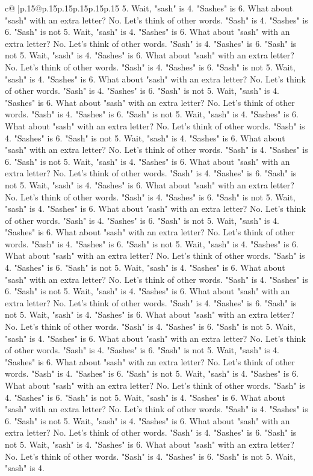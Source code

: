 \documentclass{article}
\begin{document}
{\begin{supertabular}{c@{$\;$}|p{.15\linewidth}@{}p{.15\linewidth}p{.15\linewidth}p{.15\linewidth}p{.15\linewidth}p{.15\linewidth}}
{{{5. Wait, "sash" is 4. "Sashes" is 6. What about "sash" with an extra letter? No. Let's think of other words. "Sash" is 4. "Sashes" is 6. "Sash" is not 5. Wait, "sash" is 4. "Sashes" is 6. What about "sash" with an extra letter? No. Let's think of other words. "Sash" is 4. "Sashes" is 6. "Sash" is not 5. Wait, "sash" is 4. "Sashes" is 6. What about "sash" with an extra letter? No. Let's think of other words. "Sash" is 4. "Sashes" is 6. "Sash" is not 5. Wait, "sash" is 4. "Sashes" is 6. What about "sash" with an extra letter? No. Let's think of other words. "Sash" is 4. "Sashes" is 6. "Sash" is not 5. Wait, "sash" is 4. "Sashes" is 6. What about "sash" with an extra letter? No. Let's think of other words. "Sash" is 4. "Sashes" is 6. "Sash" is not 5. Wait, "sash" is 4. "Sashes" is 6. What about "sash" with an extra letter? No. Let's think of other words. "Sash" is 4. "Sashes" is 6. "Sash" is not 5. Wait, "sash" is 4. "Sashes" is 6. What about "sash" with an extra letter? No. Let's think of other words. "Sash" is 4. "Sashes" is 6. "Sash" is not 5. Wait, "sash" is 4. "Sashes" is 6. What about "sash" with an extra letter? No. Let's think of other words. "Sash" is 4. "Sashes" is 6. "Sash" is not 5. Wait, "sash" is 4. "Sashes" is 6. What about "sash" with an extra letter? No. Let's think of other words. "Sash" is 4. "Sashes" is 6. "Sash" is not 5. Wait, "sash" is 4. "Sashes" is 6. What about "sash" with an extra letter? No. Let's think of other words. "Sash" is 4. "Sashes" is 6. "Sash" is not 5. Wait, "sash" is 4. "Sashes" is 6. What about "sash" with an extra letter? No. Let's think of other words. "Sash" is 4. "Sashes" is 6. "Sash" is not 5. Wait, "sash" is 4. "Sashes" is 6. What about "sash" with an extra letter? No. Let's think of other words. "Sash" is 4. "Sashes" is 6. "Sash" is not 5. Wait, "sash" is 4. "Sashes" is 6. What about "sash" with an extra letter? No. Let's think of other words. "Sash" is 4. "Sashes" is 6. "Sash" is not 5. Wait, "sash" is 4. "Sashes" is 6. What about "sash" with an extra letter? No. Let's think of other words. "Sash" is 4. "Sashes" is 6. "Sash" is not 5. Wait, "sash" is 4. "Sashes" is 6. What about "sash" with an extra letter? No. Let's think of other words. "Sash" is 4. "Sashes" is 6. "Sash" is not 5. Wait, "sash" is 4. "Sashes" is 6. What about "sash" with an extra letter? No. Let's think of other words. "Sash" is 4. "Sashes" is 6. "Sash" is not 5. Wait, "sash" is 4. "Sashes" is 6. What about "sash" with an extra letter? No. Let's think of other words. "Sash" is 4. "Sashes" is 6. "Sash" is not 5. Wait, "sash" is 4. "Sashes" is 6. What about "sash" with an extra letter? No. Let's think of other words. "Sash" is 4. "Sashes" is 6. "Sash" is not 5. Wait, "sash" is 4. "Sashes" is 6. What about "sash" with an extra letter? No. Let's think of other words. "Sash" is 4. "Sashes" is 6. "Sash" is not 5. Wait, "sash" is 4. "Sashes" is 6. What about "sash" with an extra letter? No. Let's think of other words. "Sash" is 4. "Sashes" is 6. "Sash" is not 5. Wait, "sash" is 4. "Sashes" is 6. What about "sash" with an extra letter? No. Let's think of other words. "Sash" is 4. "Sashes" is 6. "Sash" is not 5. Wait, "sash" is 4. }}}
\end{supertabular}}
\end{document}
